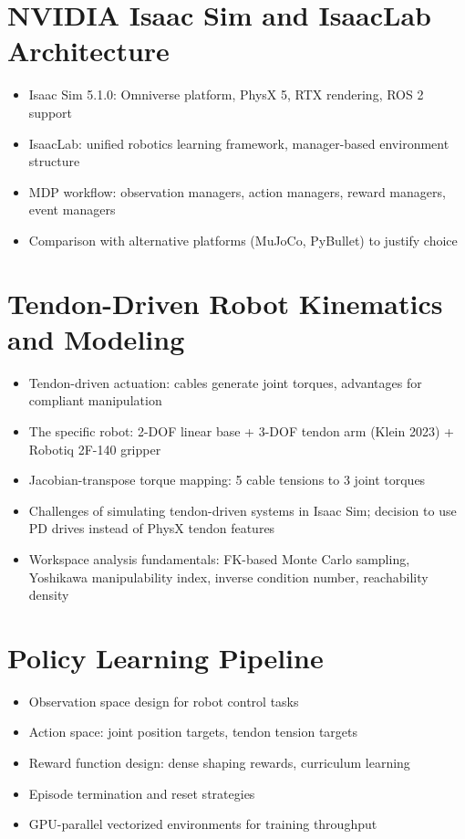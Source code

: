 \section{NVIDIA Isaac Sim and IsaacLab Architecture}
\begin{itemize}
    \item Isaac Sim 5.1.0: Omniverse platform, PhysX 5, RTX rendering, ROS 2 support
    \item IsaacLab: unified robotics learning framework, manager-based environment structure
    \item MDP workflow: observation managers, action managers, reward managers, event managers
    \item Comparison with alternative platforms (MuJoCo, PyBullet) to justify choice
\end{itemize}

\section{Tendon-Driven Robot Kinematics and Modeling}
\begin{itemize}
    \item Tendon-driven actuation: cables generate joint torques, advantages for compliant manipulation
    \item The specific robot: 2-DOF linear base + 3-DOF tendon arm (Klein 2023) + Robotiq 2F-140 gripper
    \item Jacobian-transpose torque mapping: 5 cable tensions to 3 joint torques
    \item Challenges of simulating tendon-driven systems in Isaac Sim; decision to use PD drives instead of PhysX tendon features
    \item Workspace analysis fundamentals: FK-based Monte Carlo sampling, Yoshikawa manipulability index, inverse condition number, reachability density
\end{itemize}

\section{Policy Learning Pipeline}
\begin{itemize}
    \item Observation space design for robot control tasks
    \item Action space: joint position targets, tendon tension targets
    \item Reward function design: dense shaping rewards, curriculum learning
    \item Episode termination and reset strategies
    \item GPU-parallel vectorized environments for training throughput
\end{itemize}

